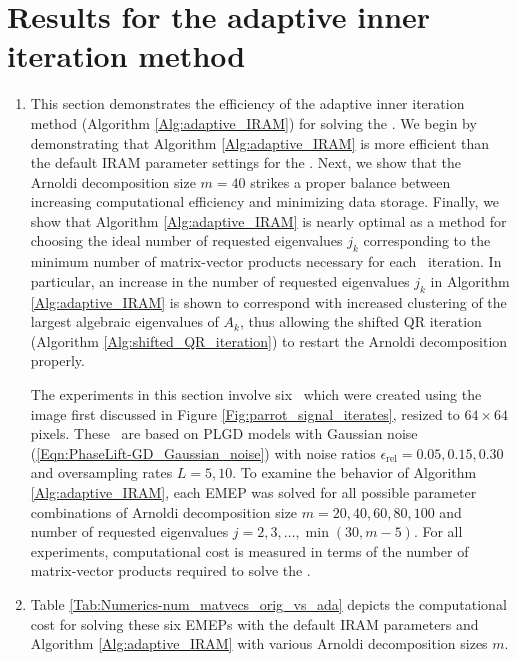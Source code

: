 \section{Results for the adaptive inner iteration method} 			\label{Subsec:Numerics-adaptive_IRAM_figs_and_tables}


\begin{enumerate}

\item

This section demonstrates the efficiency of the adaptive inner iteration method (Algorithm \ref{Alg:adaptive_IRAM}) for solving the \emep.
We begin by demonstrating that Algorithm \ref{Alg:adaptive_IRAM} is more efficient than the default IRAM parameter settings for the \emep.
Next, we show that the Arnoldi decomposition size $m=40$ strikes a proper balance between increasing computational efficiency and minimizing data storage.
Finally, we show that Algorithm \ref{Alg:adaptive_IRAM} is nearly optimal as a method for choosing the ideal number of requested eigenvalues $j_k$ corresponding to the minimum number of matrix-vector products necessary for each \emep \ iteration.
In particular, an increase in the number of requested eigenvalues $j_k$ in Algorithm \ref{Alg:adaptive_IRAM} is shown to correspond with increased clustering of the largest algebraic eigenvalues of $A_k$, thus allowing the shifted QR iteration (Algorithm \ref{Alg:shifted_QR_iteration}) to restart the Arnoldi decomposition properly.


The experiments in this section involve six \emeps \ which were created using the image first discussed in Figure \ref{Fig:parrot_signal_iterates}, resized to $64 \times 64$ pixels.  
These \emeps \ are based on PLGD models with Gaussian noise	(\ref{Eqn:PhaseLift-GD_Gaussian_noise}) with noise ratios $\epsilon_\text{rel} = 0.05, 0.15, 0.30$ and oversampling rates $L = 5, 10$.  
To examine the behavior of Algorithm \ref{Alg:adaptive_IRAM}, each EMEP was solved for all possible parameter combinations of Arnoldi decomposition size $m = 20, 40, 60, 80, 100$ and number of requested eigenvalues $j = 2, 3, \ldots, \min(30, m-5)$.  For all experiments, computational cost is measured in terms of the number of matrix-vector products required to solve the \emep.




\item


Table \ref{Tab:Numerics-num_matvecs_orig_vs_ada} depicts the computational cost for solving these six EMEPs with the default IRAM parameters and Algorithm \ref{Alg:adaptive_IRAM} with various Arnoldi decomposition sizes $m$.



\end{enumerate}
